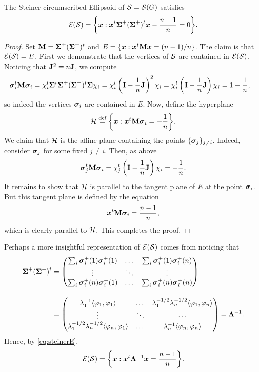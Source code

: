 \begin{lemma}
The Steiner circumscribed Ellipsoid of $\mathcal{S}=\mathcal{S}(G)$ satisfies
\begin{equation}
\label{eq:steinerE}
    \mathcal{E}(\mathcal{S}) = \bigg\{\vb*{x}: \vb*{x}^t \boldsymbol{\Sigma}^+(\boldsymbol{\Sigma}^+)^t \vb*{x} - \frac{n-1}{n}=0\bigg\}.
\end{equation}
\end{lemma}
\begin{proof}
Set $\vb{M}=\boldsymbol{\Sigma}^+(\boldsymbol{\Sigma}^+)^t$ and $E=\{\vb*{x}:\vb*{x}^t \vb{M}\vb*{x}=(n-1)/n\}$. The claim is that $\mathcal{E}(\mathcal{S})=E$.  
First we demonstrate that the vertices of $\mathcal{S}$ are contained in $\mathcal{E}(\mathcal{S})$. Noticing that $\vb{J}^2=n\vb{J}$, we compute 
\begin{align*}
    \vb*{\sigma}_i^t \vb{M} \vb*{\sigma}_i &= \chi_i^t \boldsymbol{\Sigma}^t \boldsymbol{\Sigma}^+(\boldsymbol{\Sigma}^+)^t \boldsymbol{\Sigma} \chi_i = \chi_i^t \left(\vb{I}-\frac{1}{n}\vb{J}\right)^2 \chi_i = \chi_i^t \left(\vb{I}-\frac{1}{n}\vb{J}\right) \chi_i = 1 - \frac{1}{n}, 
\end{align*}
so indeed the vertices $\vb*{\sigma}_i$ are contained in $E$. Now, define the hyperplane 
\[\mathcal{H}\overset{\text{def}}{=} \bigg\{\vb*{x}:\vb*{x}^t \vb{M} \vb*{\sigma}_i = -\frac{1}{n}\bigg\}.\]
We claim that $\mathcal{H}$ is the affine plane containing the points $\{\vb*{\sigma}_j\}_{j\neq i}$. Indeed, consider $\vb*{\sigma}_j$ for some fixed $j\neq i$. Then, as above 
\[\vb*{\sigma}_j^t \vb{M}\vb*{\sigma}_i = \chi_j^t \left(\vb{I}-\frac{1}{n}\vb{J}\right) \chi_i = -\frac{1}{n}. \]
It remains to show that $\mathcal{H}$ is parallel to the tangent plane of $E$ at the point $\vb*{\sigma}_i$. But this tangent plane is defined by the equation~\cite{fiedler2005geometry} 
\[\vb*{x}^t \vb{M}\vb*{\sigma}_i =\frac{n-1}{n},\]
which is clearly parallel to $\mathcal{H}$. This completes the proof.
\end{proof}

Perhaps a more insightful representation of $\mathcal{E}(\mathcal{S})$ comes from noticing that 
\begin{align*}
    \boldsymbol{\Sigma}^+(\boldsymbol{\Sigma}^+)^t &= 
    \begin{pmatrix}
\sum_i \vb*{\sigma}_i^+(1)\vb*{\sigma}_i^+(1) & \dots & \sum_i \vb*{\sigma}_i^+(1)\vb*{\sigma}_i^+(n) \\
\vdots &\ddots  & \vdots \\
\sum_i \vb*{\sigma}_i^+(n)\vb*{\sigma}_i^+(1) & \dots & \sum_i \vb*{\sigma}_i^+(n)\vb*{\sigma}_i^+(n)
\end{pmatrix}
\\[10pt]
&= 
\begin{pmatrix}
\lambda_1^{-1} \langle \varphi_1,\varphi_1\rangle & \dots & \lambda_1^{-1/2}\lambda_n^{-1/2}\langle \varphi_1,\varphi_n\rangle \\
\vdots & \ddots & \cdots \\
\lambda_1^{-1/2}\lambda_n^{-1/2}\langle \varphi_n,\varphi_1\rangle & \dots &\lambda_n^{-1} \langle \varphi_n,\varphi_n\rangle 
\end{pmatrix} = \vb{\Lambda}^{-1}.
\end{align*}
Hence, by \eqref{eq:steinerE},
\begin{equation}
\label{eq:steinerE2}
    \mathcal{E}(\mathcal{S}) = \bigg\{\vb*{x}:\vb*{x}^t \vb{\Lambda}^{-1}\vb*{x} = \frac{n-1}{n}\bigg\}.
\end{equation}


